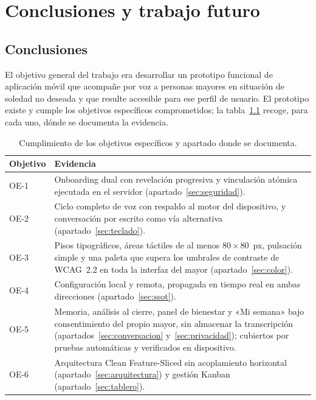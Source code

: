 \chapter{Conclusiones y trabajo futuro}
\label{cap:desarrollo-futuro}

\section{Conclusiones}
\label{sec:conclusiones}

El objetivo general del trabajo era desarrollar un prototipo funcional de aplicación móvil que acompañe por voz a personas mayores en situación de soledad no deseada y que resulte accesible para ese perfil de usuario. El prototipo existe y cumple los objetivos específicos comprometidos; la tabla~\ref{tab:cumplimiento-oe} recoge, para cada uno, dónde se documenta la evidencia.

\begin{table}[htbp]
    \centering
    \caption{Cumplimiento de los objetivos específicos y apartado donde se documenta.}
    \label{tab:cumplimiento-oe}
    \small
    \begin{tabularx}{\textwidth}{@{}l >{\RaggedRight\arraybackslash}X@{}}
        \toprule
        \textbf{Objetivo} & \textbf{Evidencia} \\
        \midrule
        OE-1 & Onboarding dual con revelación progresiva y vinculación atómica ejecutada en el servidor (apartado~\ref{sec:seguridad}). \\
        \addlinespace
        OE-2 & Ciclo completo de voz con respaldo al motor del dispositivo, y conversación por escrito como vía alternativa (apartado~\ref{sec:teclado}). \\
        \addlinespace
        OE-3 & Pisos tipográficos, áreas táctiles de al menos $80\times80$~px, pulsación simple y una paleta que supera los umbrales de contraste de WCAG~2.2 en toda la interfaz del mayor (apartado~\ref{sec:color}). \\
        \addlinespace
        OE-4 & Configuración local y remota, propagada en tiempo real en ambas direcciones (apartado~\ref{sec:ssot}). \\
        \addlinespace
        OE-5 & Memoria, análisis al cierre, panel de bienestar y «Mi semana» bajo consentimiento del propio mayor, sin almacenar la transcripción (apartados~\ref{sec:conversacion} y~\ref{sec:privacidad}); cubiertos por pruebas automáticas y verificados en dispositivo. \\
        \addlinespace
        OE-6 & Arquitectura Clean Feature-Sliced sin acoplamiento horizontal (apartado~\ref{sec:arquitectura}) y gestión Kanban (apartado~\ref{sec:tablero}). \\
        \bottomrule
    \end{tabularx}

\end{table}

